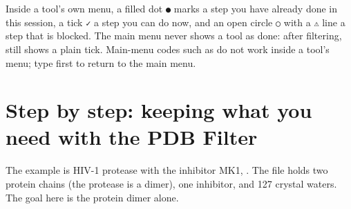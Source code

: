 Inside a tool's own menu, a filled dot \texttt{●} marks a step you have
already done in this session, a tick \texttt{✓} a step you can do now, and an
open circle \texttt{○} with a \texttt{⚠} line a step that is blocked. The main
menu never shows a tool as done: after filtering,  still shows a plain
tick. Main-menu codes such as
 do not work inside a tool's menu; type  first to return to the
main menu.

\section{Step by step: keeping what you need with the PDB Filter}
\label{sec:cleaning-filter}

The example is HIV-1 protease with the inhibitor MK1, . The file holds
two protein chains (the protease is a dimer), one inhibitor, and 127 crystal
waters. The goal here is the protein dimer alone.

